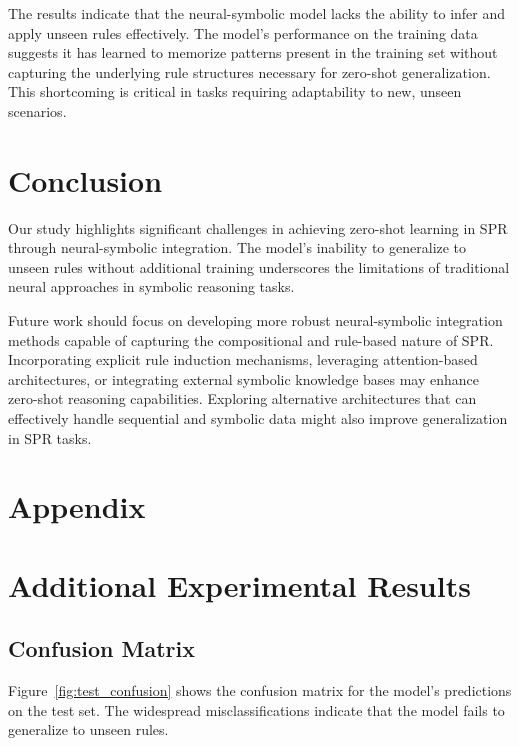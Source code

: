 \documentclass{article} %
\begin{document}
The results indicate that the neural-symbolic model lacks the ability to infer and apply unseen rules effectively. The model's performance on the training data suggests it has learned to memorize patterns present in the training set without capturing the underlying rule structures necessary for zero-shot generalization. This shortcoming is critical in tasks requiring adaptability to new, unseen scenarios.

\section{Conclusion}
\label{sec:conclusion}

Our study highlights significant challenges in achieving zero-shot learning in SPR through neural-symbolic integration. The model's inability to generalize to unseen rules without additional training underscores the limitations of traditional neural approaches in symbolic reasoning tasks.

Future work should focus on developing more robust neural-symbolic integration methods capable of capturing the compositional and rule-based nature of SPR. Incorporating explicit rule induction mechanisms, leveraging attention-based architectures, or integrating external symbolic knowledge bases may enhance zero-shot reasoning capabilities. Exploring alternative architectures that can effectively handle sequential and symbolic data might also improve generalization in SPR tasks.




\appendix

\section*{\LARGE Appendix}

\section{Additional Experimental Results}
\label{sec:additional_results}

\subsection{Confusion Matrix}

Figure~\ref{fig:test_confusion} shows the confusion matrix for the model's predictions on the test set. The widespread misclassifications indicate that the model fails to generalize to unseen rules.
\end{document}

